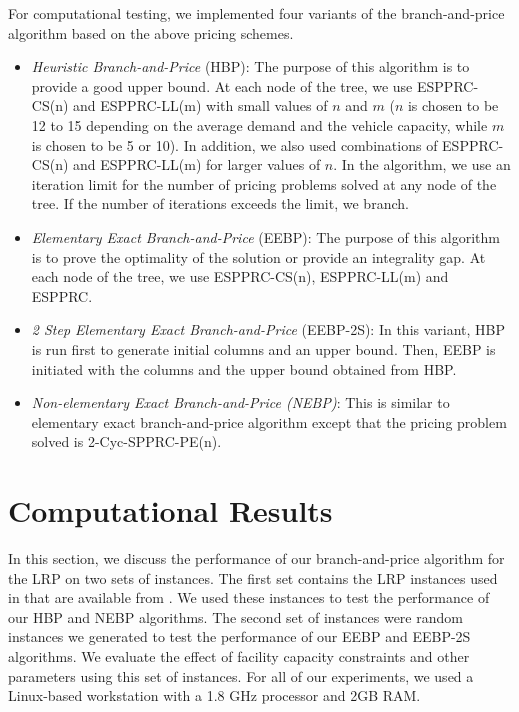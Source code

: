\documentclass[graybox]{./styles/svmult}
\begin{document}
For computational testing, we implemented four variants of the
branch-and-price algorithm based on the above pricing schemes.
\begin{itemize}
\item \emph{Heuristic Branch-and-Price} (HBP): The purpose of this
algorithm is to provide a good upper bound. At each node of the tree,
we use ESPPRC-CS(n) and ESPPRC-LL(m) with small values of $n$ and
$m$ ($n$ is chosen to be 12 to 15 depending on the average demand and
the vehicle capacity, while $m$ is chosen to be 5 or 10). In addition, we
also used combinations of ESPPRC-CS(n) and ESPPRC-LL(m) for
larger values of $n$. In the algorithm, we use an iteration limit for
the number of pricing problems solved at any node of the tree. If the
number of iterations exceeds the limit, we branch.

\item \emph{Elementary Exact Branch-and-Price} (EEBP): The purpose of
this algorithm is to prove the optimality of the solution or provide
an integrality gap. At each node of the tree,
we use ESPPRC-CS(n), ESPPRC-LL(m) and ESPPRC.

\item \emph{2 Step Elementary Exact Branch-and-Price} (EEBP-2S): In
  this variant, HBP is run first to generate initial columns and an
  upper bound. Then, EEBP is initiated with the columns and the upper
  bound obtained from HBP.

\item \emph{Non-elementary Exact Branch-and-Price (NEBP)}: This is
similar to elementary exact branch-and-price algorithm except that
the pricing problem solved is 2-Cyc-SPPRC-PE(n).

\end{itemize}

\section{Computational Results}
\label{sec:CompR}
In this section, we discuss the performance of our branch-and-price
algorithm for the LRP on two sets of instances. The first set contains the
LRP instances used in \citet{Barreto07} that are available from
\citet{Barreto-data}. 
We used these instances to test the performance of our HBP and NEBP
algorithms. The second set of instances were random instances we
generated to test the performance of our EEBP and EEBP-2S algorithms.
We evaluate the effect of facility capacity constraints and other
parameters using this set of instances. For all of our experiments, we
used a Linux-based workstation with a 1.8 GHz processor and 2GB RAM.
\end{document}
